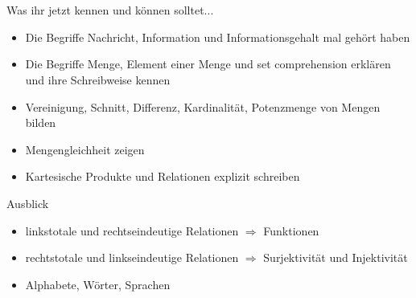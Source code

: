\section{}
	\begin{frame}{Was ihr jetzt kennen und können solltet...}
			\begin{itemize}
				\item Die Begriffe Nachricht, Information und Informationsgehalt mal gehört haben
				\item Die Begriffe Menge, Element einer Menge und set comprehension erklären und ihre Schreibweise kennen
				\item Vereinigung, Schnitt, Differenz, Kardinalität, Potenzmenge von Mengen bilden
				\item Mengengleichheit zeigen
				\item Kartesische Produkte und Relationen explizit schreiben
			\end{itemize}
	
	\end{frame}
	\begin{frame}{Ausblick}
		\begin{itemize}
			\item linkstotale und rechtseindeutige Relationen $\Rightarrow$ Funktionen
			\item rechtstotale und linkseindeutige Relationen $\Rightarrow$ Surjektivität und Injektivität
			\item Alphabete, Wörter, Sprachen
		\end{itemize}
	\end{frame}
\section{}
\questionframe
{}
\slideThanks
{}
